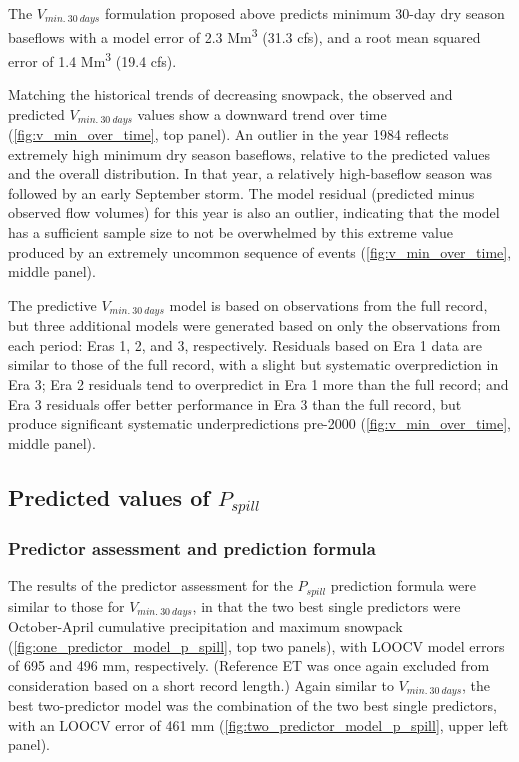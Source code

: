 \documentclass[hess, manuscript]{copernicus}
\begin{document}
The \(V_{min.~30~days}\) formulation proposed above predicts minimum
30-day dry season baseflows with a model error of 2.3
Mm\textsuperscript{3} (31.3 cfs), and a root mean squared error of 1.4
Mm\textsuperscript{3} (19.4 cfs).

Matching the historical trends of decreasing snowpack, the observed and
predicted \(V_{min.~30~days}\) values show a downward trend over time
(\autoref{fig:v_min_over_time}, top panel). An outlier in the year 1984
reflects extremely high minimum dry season baseflows, relative to the
predicted values and the overall distribution. In that year, a
relatively high-baseflow season was followed by an early September
storm. The model residual (predicted minus observed flow volumes) for
this year is also an outlier, indicating that the model has a sufficient
sample size to not be overwhelmed by this extreme value produced by an
extremely uncommon sequence of events (\autoref{fig:v_min_over_time},
middle panel).

The predictive \(V_{min.~30~days}\) model is based on observations from
the full record, but three additional models were generated based on
only the observations from each period: Eras 1, 2, and 3, respectively.
Residuals based on Era 1 data are similar to those of the full record,
with a slight but systematic overprediction in Era 3; Era 2 residuals
tend to overpredict in Era 1 more than the full record; and Era 3
residuals offer better performance in Era 3 than the full record, but
produce significant systematic underpredictions pre-2000
(\autoref{fig:v_min_over_time}, middle panel).

\subsection{\texorpdfstring{Predicted values of
\(P_{spill}\)}{Predicted values of P\_\{spill\}}}

\subsubsection{Predictor assessment and prediction formula}

The results of the predictor assessment for the \(P_{spill}\) prediction
formula were similar to those for \(V_{min.~30~days}\), in that the two
best single predictors were October-April cumulative precipitation and
maximum snowpack (\autoref{fig:one_predictor_model_p_spill}, top two
panels), with LOOCV model errors of 695 and 496 mm, respectively.
(Reference ET was once again excluded from consideration based on a
short record length.) Again similar to \(V_{min.~30~days}\), the best
two-predictor model was the combination of the two best single
predictors, with an LOOCV error of 461 mm
(\autoref{fig:two_predictor_model_p_spill}, upper left panel).
\end{document}
